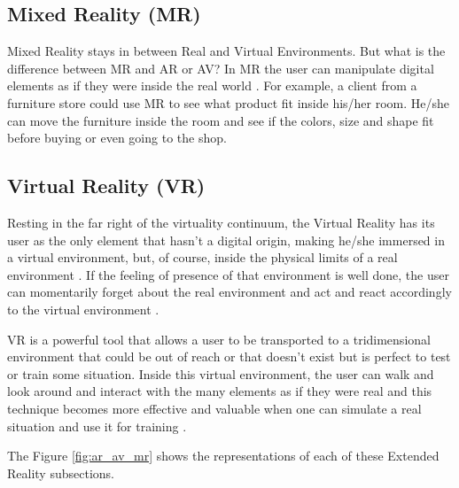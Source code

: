 \subsection{Mixed Reality (MR)}
\label{subsec:mixed_reality}

    Mixed Reality stays in between Real and Virtual Environments. But what is the difference between MR and AR or AV? In MR the user can manipulate digital elements as if they were inside the real world \cite{doolani2020review}. For example, a client from a furniture store could use MR to see what product fit inside his/her room. He/she can move the furniture inside the room and see if the colors, size and shape fit before buying or even going to the shop.
    
\subsection{Virtual Reality (VR)}
\label{subsec:virtual_reality}

    Resting in the far right of the virtuality continuum, the Virtual Reality has its user as the only element that hasn't a digital origin, making he/she immersed in a virtual environment, but, of course, inside the physical limits of a real environment \cite{ma2007virtuality}. If the feeling of presence of that environment is well done, the user can momentarily forget about the real environment and act and react accordingly to the virtual environment \cite{farrell2018learning}. 
    
    VR is a powerful tool that allows a user to be transported to a tridimensional environment that could be out of reach or that doesn't exist but is perfect to test or train some situation. Inside this virtual environment, the user can walk and look around and interact with the many elements as if they were real \cite{mujber2004virtual} and this technique becomes more effective and valuable when one can simulate a real situation and use it for training \cite{salah2019virtual}.
    
The Figure \ref{fig:ar_av_mr} shows the representations of each of these Extended Reality subsections.
    
